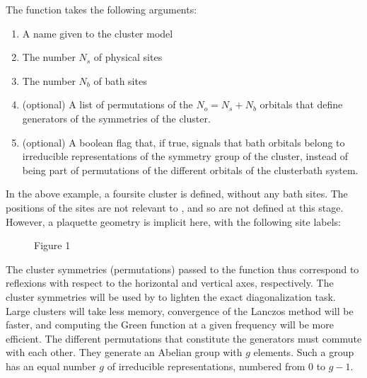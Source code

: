 \documentclass[letterpaper,10pt,english]{sphinxmanual}
\let\sphinxpxdimen\pdfpxdimen\else\newdimen\sphinxpxdimen
\begin{document}
\sphinxAtStartPar
The function  takes the following arguments:
\begin{enumerate}
%
\item {} 
\sphinxAtStartPar
A name given to the cluster model

\item {} 
\sphinxAtStartPar
The number \(N_s\) of physical sites

\item {} 
\sphinxAtStartPar
The number \(N_b\)  of bath sites

\item {} 
\sphinxAtStartPar
(optional) A list of permutations of the  \(N_o=N_s+N_b\)  orbitals that define generators of the symmetries of the cluster.

\item {} 
\sphinxAtStartPar
(optional) A boolean flag that, if true, signals that bath orbitals belong to irreducible representations of the symmetry group of the cluster, instead of being part of permutations of the different orbitals of the cluster\sphinxhyphen{}bath system.

\end{enumerate}

\sphinxAtStartPar
In the above example, a four\sphinxhyphen{}site cluster is defined, without any bath sites. The positions of the sites are not relevant to , and so are not defined at this stage.
However, a plaquette geometry is implicit here, with the following site labels:

\begin{figure}[htbp]
\centering
\capstart

\noindent\sphinxincludegraphics[height=100\sphinxpxdimen]{{2x2}.png}
\caption{Figure 1}\label{\detokenize{defining_models:id1}}\end{figure}

\sphinxAtStartPar
The cluster symmetries (permutations) passed to the function thus correspond to reflexions with respect to the horizontal and vertical axes, respectively.
The cluster symmetries will be used by  to lighten the exact diagonalization task. Large clusters will take less memory, convergence of the Lanczos method will be faster, and computing the Green function at a given frequency will be more efficient.
The different permutations that constitute the generators must commute with each other. They generate an Abelian group with \(g\) elements. Such a group has an equal number \(g\) of irreducible representations, numbered from 0 to \(g-1\).
\end{document}
